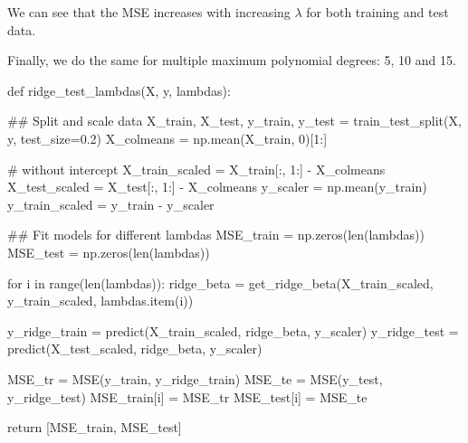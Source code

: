\documentclass[
  letterpaper,
  DIV=11,
  numbers=noendperiod]{scrartcl}
\newenvironment{Shaded}{\begin{snugshade}}{\end{snugshade}}
\newcommand{\BuiltInTok}[1]{\textcolor[rgb]{0.00,0.23,0.31}{#1}}
\newcommand{\CommentTok}[1]{\textcolor[rgb]{0.37,0.37,0.37}{#1}}
\newcommand{\ControlFlowTok}[1]{\textcolor[rgb]{0.00,0.23,0.31}{#1}}
\newcommand{\DecValTok}[1]{\textcolor[rgb]{0.68,0.00,0.00}{#1}}
\newcommand{\FloatTok}[1]{\textcolor[rgb]{0.68,0.00,0.00}{#1}}
\newcommand{\KeywordTok}[1]{\textcolor[rgb]{0.00,0.23,0.31}{#1}}
\newcommand{\NormalTok}[1]{\textcolor[rgb]{0.00,0.23,0.31}{#1}}
\newcommand{\OperatorTok}[1]{\textcolor[rgb]{0.37,0.37,0.37}{#1}}
\begin{document}
We can see that the MSE increases with increasing \(\lambda\) for both
training and test data.

Finally, we do the same for multiple maximum polynomial degrees: 5, 10
and 15.

\begin{Shaded}
\begin{Highlighting}[]
\KeywordTok{def}\NormalTok{ ridge\_test\_lambdas(X, y, lambdas):}
    
    \CommentTok{\#\# Split and scale data}
\NormalTok{    X\_train, X\_test, y\_train, y\_test }\OperatorTok{=}\NormalTok{ train\_test\_split(X, y, test\_size}\OperatorTok{=}\FloatTok{0.2}\NormalTok{)}
\NormalTok{    X\_colmeans }\OperatorTok{=}\NormalTok{ np.mean(X\_train, }\DecValTok{0}\NormalTok{)[}\DecValTok{1}\NormalTok{:]}

    \CommentTok{\# without intercept}
\NormalTok{    X\_train\_scaled }\OperatorTok{=}\NormalTok{ X\_train[:, }\DecValTok{1}\NormalTok{:] }\OperatorTok{{-}}\NormalTok{ X\_colmeans}
\NormalTok{    X\_test\_scaled }\OperatorTok{=}\NormalTok{ X\_test[:, }\DecValTok{1}\NormalTok{:] }\OperatorTok{{-}}\NormalTok{ X\_colmeans}
\NormalTok{    y\_scaler }\OperatorTok{=}\NormalTok{ np.mean(y\_train)}
\NormalTok{    y\_train\_scaled }\OperatorTok{=}\NormalTok{ y\_train }\OperatorTok{{-}}\NormalTok{ y\_scaler}
    
    \CommentTok{\#\# Fit models for different lambdas}
\NormalTok{    MSE\_train }\OperatorTok{=}\NormalTok{ np.zeros(}\BuiltInTok{len}\NormalTok{(lambdas))}
\NormalTok{    MSE\_test }\OperatorTok{=}\NormalTok{ np.zeros(}\BuiltInTok{len}\NormalTok{(lambdas))}
    
    \ControlFlowTok{for}\NormalTok{ i }\KeywordTok{in} \BuiltInTok{range}\NormalTok{(}\BuiltInTok{len}\NormalTok{(lambdas)):}
\NormalTok{        ridge\_beta }\OperatorTok{=}\NormalTok{ get\_ridge\_beta(X\_train\_scaled, y\_train\_scaled,}
\NormalTok{                                    lambdas.item(i))}

\NormalTok{        y\_ridge\_train }\OperatorTok{=}\NormalTok{ predict(X\_train\_scaled, ridge\_beta, y\_scaler)}
\NormalTok{        y\_ridge\_test }\OperatorTok{=}\NormalTok{ predict(X\_test\_scaled, ridge\_beta, y\_scaler)}
        
\NormalTok{        MSE\_tr }\OperatorTok{=}\NormalTok{ MSE(y\_train, y\_ridge\_train)}
\NormalTok{        MSE\_te }\OperatorTok{=}\NormalTok{ MSE(y\_test, y\_ridge\_test)}
\NormalTok{        MSE\_train[i] }\OperatorTok{=}\NormalTok{ MSE\_tr}
\NormalTok{        MSE\_test[i] }\OperatorTok{=}\NormalTok{ MSE\_te}
    
    \ControlFlowTok{return}\NormalTok{ [MSE\_train, MSE\_test]}
\end{Highlighting}
\end{Shaded}
\end{document}

